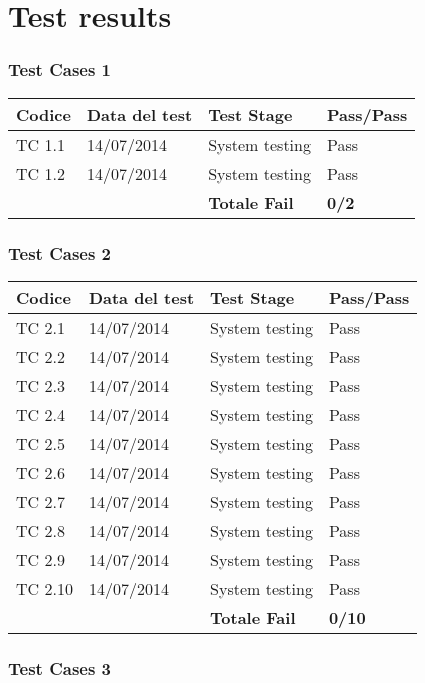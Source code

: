 \chapter{Test results}

\subsection{Test Cases 1}

\begin{tabular}{|p{3cm}|p{3cm}|p{3cm}|p{3cm}|}
	\hline
	\rowcolor{Gray}
	\textbf{Codice} & \textbf{Data del test} & \textbf{Test Stage}  & \textbf{Pass/Pass}\tabularnewline
	\hline
	TC 1.1			& 14/07/2014 			& System testing		& Pass \tabularnewline
	\hline
	TC 1.2			& 14/07/2014 			& System testing		& Pass \tabularnewline
	\hline
					& 						& \textbf{Totale Fail}	& \textbf{0/2} \tabularnewline
	\hline
\end{tabular}

\subsection{Test Cases 2}

\begin{tabular}{|p{3cm}|p{3cm}|p{3cm}|p{3cm}|}
	\hline
	\rowcolor{Gray}
	\textbf{Codice} & \textbf{Data del test} & \textbf{Test Stage} & \textbf{Pass/Pass}\tabularnewline
	\hline
	TC 2.1			& 14/07/2014 			& System testing		& Pass \tabularnewline
	\hline
	TC 2.2			& 14/07/2014 			& System testing		& Pass \tabularnewline
	\hline
	TC 2.3			& 14/07/2014 			& System testing		& Pass \tabularnewline
	\hline
	TC 2.4			& 14/07/2014 			& System testing		& Pass \tabularnewline
	\hline
	TC 2.5			& 14/07/2014 			& System testing		& Pass \tabularnewline
	\hline
	TC 2.6			& 14/07/2014 			& System testing		& Pass \tabularnewline
	\hline
	TC 2.7			& 14/07/2014 			& System testing		& Pass \tabularnewline
	\hline
	TC 2.8			& 14/07/2014 			& System testing		& Pass \tabularnewline
	\hline
	TC 2.9			& 14/07/2014 			& System testing		& Pass \tabularnewline
	\hline
	TC 2.10			& 14/07/2014 			& System testing		& Pass \tabularnewline
	\hline
					& 						& \textbf{Totale Fail}	& \textbf{0/10} \tabularnewline
	\hline
\end{tabular}

\subsection{Test Cases 3}

